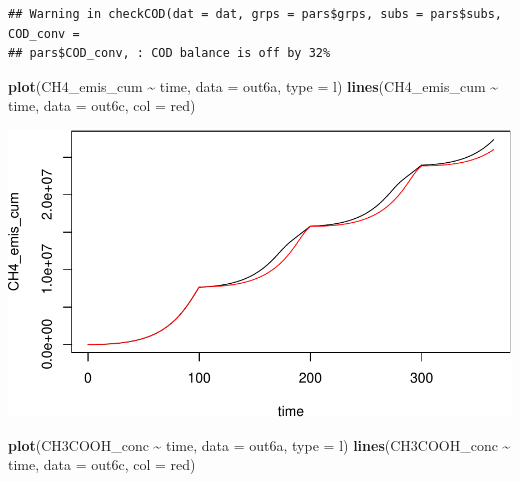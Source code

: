 \documentclass[
]{article}
\newenvironment{Shaded}{\begin{snugshade}}{\end{snugshade}}
\newcommand{\AttributeTok}[1]{\textcolor[rgb]{0.13,0.29,0.53}{#1}}
\newcommand{\FunctionTok}[1]{\textcolor[rgb]{0.13,0.29,0.53}{\textbf{#1}}}
\newcommand{\NormalTok}[1]{#1}
\newcommand{\SpecialCharTok}[1]{\textcolor[rgb]{0.81,0.36,0.00}{\textbf{#1}}}
\newcommand{\StringTok}[1]{\textcolor[rgb]{0.31,0.60,0.02}{#1}}
\begin{document}
\begin{verbatim}
## Warning in checkCOD(dat = dat, grps = pars$grps, subs = pars$subs, COD_conv =
## pars$COD_conv, : COD balance is off by 32%
\end{verbatim}

\begin{Shaded}
\begin{Highlighting}[]
\FunctionTok{plot}\NormalTok{(CH4\_emis\_cum }\SpecialCharTok{\textasciitilde{}}\NormalTok{ time, }\AttributeTok{data =}\NormalTok{ out6a, }\AttributeTok{type =} \StringTok{\textquotesingle{}l\textquotesingle{}}\NormalTok{)}
\FunctionTok{lines}\NormalTok{(CH4\_emis\_cum }\SpecialCharTok{\textasciitilde{}}\NormalTok{ time, }\AttributeTok{data =}\NormalTok{ out6c, }\AttributeTok{col =} \StringTok{\textquotesingle{}red\textquotesingle{}}\NormalTok{)}
\end{Highlighting}
\end{Shaded}

\includegraphics{simple_demo_files/figure-latex/unnamed-chunk-49-1.pdf}

\begin{Shaded}
\begin{Highlighting}[]
\FunctionTok{plot}\NormalTok{(CH3COOH\_conc }\SpecialCharTok{\textasciitilde{}}\NormalTok{ time, }\AttributeTok{data =}\NormalTok{ out6a, }\AttributeTok{type =} \StringTok{\textquotesingle{}l\textquotesingle{}}\NormalTok{)}
\FunctionTok{lines}\NormalTok{(CH3COOH\_conc }\SpecialCharTok{\textasciitilde{}}\NormalTok{ time, }\AttributeTok{data =}\NormalTok{ out6c, }\AttributeTok{col =} \StringTok{\textquotesingle{}red\textquotesingle{}}\NormalTok{)}
\end{Highlighting}
\end{Shaded}
\end{document}
